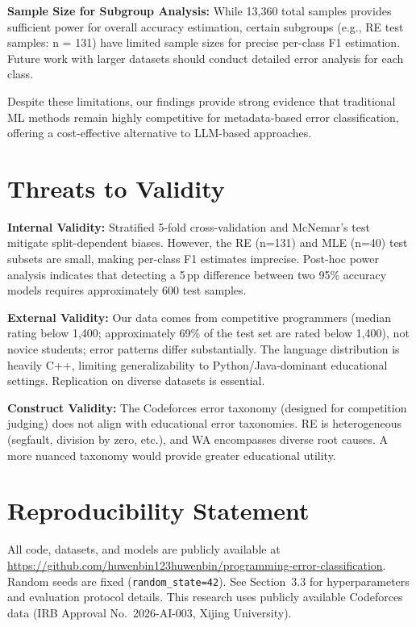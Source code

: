 \documentclass[acmsmall]{acmart}
\begin{document}
\textbf{Sample Size for Subgroup Analysis:} While 13,360 total samples provides
sufficient power for overall accuracy estimation, certain subgroups (e.g., RE
test samples: n = 131) have limited sample sizes for precise per-class F1
estimation. Future work with larger datasets should conduct detailed error
analysis for each class.

Despite these limitations, our findings provide strong evidence that
traditional ML methods remain highly competitive for metadata-based error
classification, offering a cost-effective alternative to LLM-based approaches.

\section{Threats to Validity}

\textbf{Internal Validity:} Stratified 5-fold cross-validation and McNemar's
test mitigate split-dependent biases. However, the RE (n=131) and MLE (n=40)
test subsets are small, making per-class F1 estimates imprecise. Post-hoc
power analysis indicates that detecting a 5\,pp difference between two 95\%
accuracy models requires approximately 600 test samples.

\textbf{External Validity:} Our data comes from competitive programmers
(median rating below 1,400; approximately 69\% of the test set are rated
below 1,400), not novice students; error patterns differ
substantially. The language distribution is heavily C++, limiting
generalizability to Python/Java-dominant educational settings. Replication on
diverse datasets is essential.

\textbf{Construct Validity:} The Codeforces error taxonomy (designed for
competition judging) does not align with educational error taxonomies. RE is
heterogeneous (segfault, division by zero, etc.), and WA encompasses diverse
root causes. A more nuanced taxonomy would provide greater educational
utility.

\section*{Reproducibility Statement}

\begin{sloppypar}\raggedright
All code, datasets, and models are publicly available at
\url{https://github.com/huwenbin123huwenbin/programming-error-classification}. Random
seeds are fixed (\texttt{random\_state=42}). See Section~3.3 for
hyperparameters and evaluation protocol details. This research uses publicly
available Codeforces data (IRB Approval No.~2026-AI-003, Xijing University).
\end{sloppypar}
\end{document}
